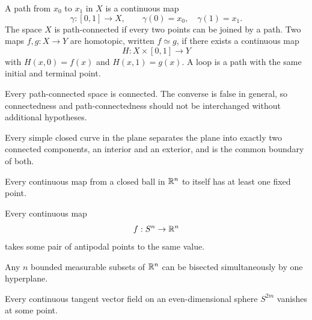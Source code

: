     \begin{definition}
        A path from $x_0$ to $x_1$ in $X$ is a continuous map
        \[
            \gamma:[0,1]\to X,
            \qquad
            \gamma(0)=x_0,
            \quad
            \gamma(1)=x_1.
        \]
        The space $X$ is path-connected if every two points can be joined by a
        path. Two maps $f,g:X\to Y$ are homotopic, written $f\simeq g$, if
        there exists a continuous map
        \[
            H:X\times[0,1]\to Y
        \]
        with $H(x,0)=f(x)$ and $H(x,1)=g(x)$. A loop is a path with the same
        initial and terminal point.
    \end{definition}

    \begin{theorem}
        Every path-connected space is connected. The converse is false in
        general, so connectedness and path-connectedness should not be
        interchanged without additional hypotheses.
    \end{theorem}

    \begin{theorem}
        Every simple closed curve in the plane separates the plane into exactly
        two connected components, an interior and an exterior, and is the
        common boundary of both.
    \end{theorem}

    \begin{theorem}
        Every continuous map from a closed ball in $\mathbb{R}^n$ to itself has at least
        one fixed point.
    \end{theorem}

    \begin{theorem}
        Every continuous map
        \[
            f:S^n\to\mathbb{R}^n
        \]
        takes some pair of antipodal points to the same value.
    \end{theorem}

    \begin{corollary}
        Any $n$ bounded measurable subsets of $\mathbb{R}^n$ can be bisected
        simultaneously by one hyperplane.
    \end{corollary}

    \begin{theorem}
        Every continuous tangent vector field on an even-dimensional sphere
        $S^{2m}$ vanishes at some point.
    \end{theorem}

